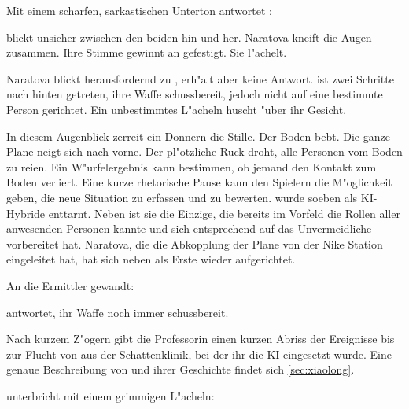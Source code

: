 Mit einem scharfen, sarkastischen Unterton antwortet \xl{}:


\ml{} blickt unsicher zwischen den beiden hin und her. Naratova kneift die Augen zusammen. Ihre Stimme gewinnt an gefestigt. Sie l"achelt.


Naratova blickt herausfordernd zu \xl{}, erh"alt aber keine Antwort. \xl{} ist zwei Schritte nach hinten getreten, ihre Waffe schussbereit, jedoch nicht auf eine bestimmte Person gerichtet. Ein unbestimmtes L"acheln huscht "uber ihr Gesicht.

In diesem Augenblick zerrei\3t ein Donnern die Stille. Der Boden bebt. Die ganze Plane neigt sich nach vorne. Der pl"otzliche Ruck droht, alle Personen vom Boden zu rei\3en. Ein W"urfelergebnis kann bestimmen, ob jemand den Kontakt zum Boden verliert. Eine kurze rhetorische Pause kann den Spielern die M"oglichkeit geben, die neue Situation zu erfassen und zu bewerten. \xl{} wurde soeben als KI-Hybride enttarnt. Neben \ml{} ist sie die Einzige, die bereits im Vorfeld die Rollen aller anwesenden Personen kannte und sich entsprechend auf das Unvermeidliche vorbereitet hat. Naratova, die die Abkopplung der Plane von der Nike Station eingeleitet hat, hat sich neben \xl{} als Erste wieder aufgerichtet. 

An die Ermittler gewandt:


\xl{} antwortet, ihr Waffe noch immer schussbereit.


Nach kurzem Z"ogern gibt die Professorin einen kurzen Abriss der Ereignisse bis zur Flucht von \xl{} aus der Schattenklinik, bei der ihr die KI eingesetzt wurde. Eine genaue Beschreibung von \xl{} und ihrer Geschichte findet sich \cref{sec:xiaolong}.

\xl{} unterbricht mit einem grimmigen L"acheln:


